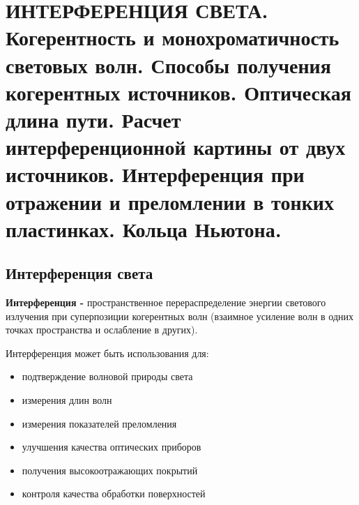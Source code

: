 \documentclass[12pt]{report}
\begin{document}
\section{ИНТЕРФЕРЕНЦИЯ СВЕТА. Когерентность и монохроматичность световых волн. Способы получения когерентных источников. Оптическая длина пути. Расчет интерференционной картины от двух источников. Интерференция при отражении и преломлении в тонких пластинках. Кольца Ньютона.}
\subsection{Интерференция света}
\textbf{Интерференция -} пространственное перераспределение энергии светового излучения при суперпозиции когерентных волн (взаимное усиление волн в одних точках пространства и ослабление в других).\par
Интерференция может быть использования для:\par
\begin{itemize}
    \item подтверждение волновой природы света\par
    \item измерения длин волн\par
    \item измерения показателей преломления\par
    \item улучшения качества оптических приборов\par
    \item получения высокоотражающих покрытий\par
    \item контроля качества обработки поверхностей\par
\end{itemize}
\end{document}
